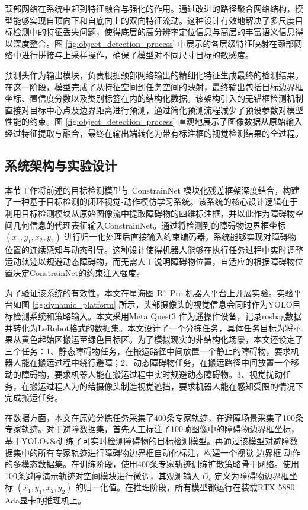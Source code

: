 颈部网络在系统中起到特征融合与强化的作用。通过改进的路径聚合网络结构，模型能够实现自顶向下和自底向上的双向特征流动。这种设计有效地解决了多尺度目标检测中的特征丢失问题，使得底层的高分辨率定位信息与高层的丰富语义信息得以深度整合。图 \ref{fig:object_detection_process} 中展示的各层级特征映射在颈部网络中进行拼接与上采样操作，确保了模型对不同尺寸目标的敏感度。

预测头作为输出模块，负责根据颈部网络输出的精细化特征生成最终的检测结果。在这一阶段，模型完成了从特征空间到任务空间的映射，最终输出包括目标边界框坐标、置信度分数以及类别标签在内的结构化数据。该架构引入的无锚框检测机制直接对目标中心点及边界距离进行预测，通过简化预测流程减少了预设参数对模型性能的约束。图 \ref{fig:object_detection_process} 直观地展示了图像数据从原始输入经过特征提取与融合，最终在输出端转化为带有标注框的视觉检测结果的全过程。
\subsection{系统架构与实验设计}
本节工作将前述的目标检测模型与 ConstrainNet 模块化残差框架深度结合，构建了一种基于目标检测的闭环视觉-动作模仿学习系统。该系统的核心设计逻辑在于利用目标检测模块从原始图像流中提取障碍物的四维标注框，并以此作为障碍物空间几何信息的代理表征输入ConstrainNet。通过将检测到的障碍物边界框坐标 $(x_{1}, y_{1}, x_{2}, y_{2})$ 进行归一化处理后直接输入约束编码器，系统能够实现对障碍物位置的连续感知与动态引导。这种设计使得机器人能够在执行任务过程中实时调整运动轨迹以规避动态障碍物，而无需人工说明障碍物位置，自适应的根据障碍物位置决定ConstrainNet的约束注入强度。

为了验证该系统的有效性，本文在星海图 R1 Pro 机器人平台上开展实验。实验平台如图 \ref{fig:dynamic_platform} 所示，头部摄像头的视觉信息会同时作为YOLO目标检测系统和策略输入。本文采用Meta Quest3 作为遥操作设备，记录rosbag数据并转化为LeRobot格式的数据集。本文设计了一个分拣任务，具体任务目标为将苹果从黄色起始区搬运至绿色目标区。为了模拟现实的非结构化场景，本文还设定了三个任务：1、静态障碍物任务，在搬运路径中间放置一个静止的障碍物，要求机器人能在搬运过程中绕行避障；2、动态障碍物任务，在搬运路径中间放置一个移动的障碍物，要求机器人能在搬运过程中实时规避动态障碍物。3、视觉扰动任务，在搬运过程人为的给摄像头制造视觉遮挡，要求机器人能在感知受限的情况下完成搬运任务。

在数据方面，本文在原始分拣任务采集了400条专家轨迹，在避障场景采集了100条专家轨迹。对于避障数据集，首先人工标注了100帧图像中的障碍物边界框坐标，基于YOLOv8s训练了可实时检测障碍物的目标检测模型。再通过该模型对避障数据集中的所有专家轨迹进行障碍物边界框自动化标注，构建一个视觉-边界框-动作的多模态数据集。在训练阶段，使用400条专家轨迹训练扩散策略骨干网络。使用100条避障演示轨迹对空间模块进行微调，其观测输入 $O_{c}$ 定义为障碍物边界框坐标 $(x_{1}, y_{1}, x_{2}, y_{2})$ 的归一化值。在推理阶段，所有模型都运行在装载RTX 5880 Ada显卡的推理机上。

